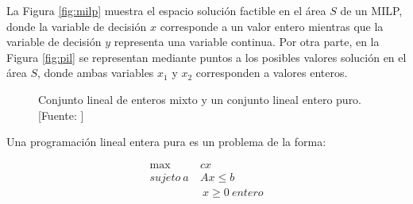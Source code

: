 La Figura \ref{fig:milp} muestra el espacio solución factible en el área $S$ de un MILP, donde la variable de decisión $x$ corresponde a un valor entero mientras que la variable de decisión $y$ representa una variable continua. Por otra parte, en la Figura \ref{fig:pil} se representan mediante puntos a los posibles valores solución en el área $S$, donde ambas variables $x_1$ y $x_2$ corresponden a valores enteros.


\begin{figure}
    \captionsetup[figure]{labelformat=empy}
    \centering
     \qquad
  \caption{Conjunto lineal de enteros mixto y un conjunto lineal entero puro. [Fuente: \cite{ConfortiIntegerProgramming}]}
  \label{fig:milp_ip}
\end{figure}

Una programación lineal entera pura es un problema de la forma:

\begin{equation} \label{programacion_entera}
\begin{aligned}
             \max\: & cx \\ 
        sujeto\:a\: & Ax \leq b \\
                    &\: x \geq 0\: entero
\end{aligned}
\end{equation}

